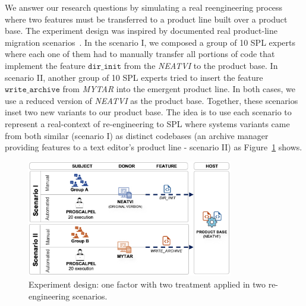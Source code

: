We answer our research questions by simulating a real reengineering process where two features must be transferred to a product line built over a product base. The experiment design was inspired by documented real product-line migration scenarios~\cite{Laguna2013, Assuncao2017}. In the scenario I, we composed a group of 10 SPL experts where each one of them had to manually transfer all portions of code that implement the feature $\texttt{dir\_init}$ from the \emph{NEATVI} to the product base. In scenario II, another group of 10 SPL experts tried to insert the feature $\texttt{write\_archive}$ from \emph{MYTAR} into the emergent product line. In both cases, we use a reduced version of \emph{NEATVI} as the product base.
Together, these scenarios inset two new variants to our product base. The idea is to use each scenario to represent a real-context of re-engineering to SPL where systems variants came from both similar (scenario I) as distinct codebases (an archive manager providing features to a text editor's product line - scenario II) as Figure~\ref{fig:experiment_design} shows.

\begin{figure}[t]
	\centering \includegraphics[width=9cm]{images/experiment_design7.png}
	\centering 
	\caption{Experiment design: one factor with two treatment applied in two re-engineering scenarios.}
	\label{fig:experiment_design}
\end{figure} 

